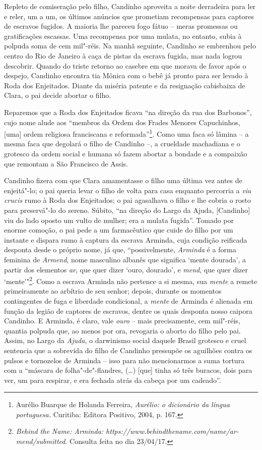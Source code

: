 Repleto de comiseração pelo filho, Candinho aproveita a noite derradeira
para ler e reler, um a um, os últimos anúncios que prometiam recompensas
para captores de escravos fugidos. A maioria lhe pareceu fogo fátuo --
meras promessas ou gratificações escassas. Uma recompensa por uma
mulata, no entanto, subia à polpuda soma de cem mil"-réis. Na manhã
seguinte, Candinho se embrenhou pelo centro do Rio de Janeiro à caça de
pistas da escrava fugida, mas nada logrou descobrir. Quando do triste
retorno ao casebre em que morava de favor após o despejo, Candinho
encontra tia Mônica com o bebê já pronto para ser levado à Roda dos
Enjeitados. Diante da miséria patente e da resignação cabisbaixa de
Clara, o pai decide abortar o filho.

Reparemos que a Roda dos Enjeitados ficava ``na direção da rua dos
Barbonos'', cujo nome alude aos ``membros da Ordem dos Frades Menores
Capuchinhos, {[}uma{]} ordem religiosa franciscana e
reformada''\footnote{Aurélio Buarque de Holanda Ferreira, \emph{Aurélio:
  o dicionário da língua portuguesa.} Curitiba: Editora Positivo, 2004,
  p. 167.}. Como uma faca só lâmina -- a mesma faca que degolará o filho
de Candinho --, a crueldade machadiana e o grotesco da ordem social e
humana só fazem abortar a bondade e a compaixão que remontam a São
Francisco de Assis.

Candinho fizera com que Clara amamentasse o filho uma última vez antes
de enjeitá"-lo; o pai queria levar o filho de volta para casa enquanto
percorria a \emph{via crucis} rumo à Roda dos Enjeitados; o pai
agasalhava o filho e lhe cobria o rosto para preservá"-lo do sereno.
Súbito, ``na direção do Largo da Ajuda, {[}Candinho{]} viu do lado
oposto um vulto de mulher; era a mulata fugida''. Tomado por enorme
comoção, o pai pede a um farmacêutico que cuide do filho por um instante
e dispara rumo à captura da escrava Arminda, cuja condição reificada
desponta desde o próprio nome, já que, ``possivelmente, \emph{Arminda} é
a forma feminina de \emph{Armend}, nome masculino albanês que significa
`mente dourada', a partir dos elementos \emph{ar}, que quer dizer `ouro,
dourado', e \emph{mend}, que quer dizer `mente'"\footnote{\emph{Behind
  the Name:} \emph{Arminda:
  https://www.behindthename.com/name/ar-
  mend/submitted}.
  Consulta feita no dia 23/04/17.}. Como a escrava Arminda não pertence
a si mesma, sua \emph{mente} a remete primeiramente ao arbítrio de seu
senhor; depois, durante os momentos contingentes de fuga e liberdade
condicional, a \emph{mente} de Arminda é alienada em função da legião de
captores de escravos, dentre os quais desponta nosso caipora Candinho. E
Arminda, é claro, vale \emph{ouro} -- mais precisamente, cem mil"-réis,
quantia polpuda que, ao menos por ora, revogaria o aborto do filho pelo
pai. Assim, no Largo da \emph{Ajuda}, o darwinismo social daquele Brasil
grotesco e cruel sentencia que a sobrevida do filho de Candinho
pressupõe os aguilhões contra os pulsos e tornozelos de Arminda -- isso
para não mencionarmos a suma tortura com a ``máscara de
folha"-de"-flandres, (\ldots{}) [que] tinha só três buracos, dois para ver,
um para respirar, e era fechada atrás da cabeça por um cadeado''.

